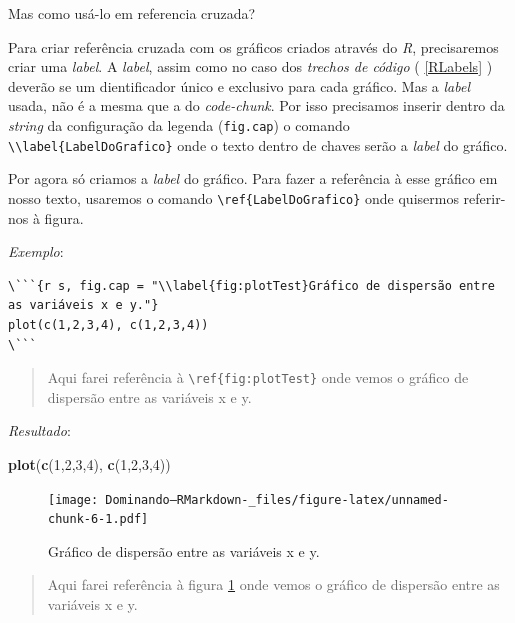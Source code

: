 \documentclass[]{book}
\newenvironment{Shaded}{\begin{snugshade}}{\end{snugshade}}
\newcommand{\DecValTok}[1]{\textcolor[rgb]{0.00,0.00,0.81}{#1}}
\newcommand{\KeywordTok}[1]{\textcolor[rgb]{0.13,0.29,0.53}{\textbf{#1}}}
\newcommand{\NormalTok}[1]{#1}
\begin{document}
Mas como usá-lo em referencia cruzada?

Para criar referência cruzada com os gráficos criados através do \emph{R}, precisaremos criar uma \emph{label}. A \emph{label}, assim como no caso dos \emph{trechos de código} ( \ref{RLabels} ) deverão se um dientificador único e exclusivo para cada gráfico. Mas a \emph{label} usada, não é a mesma que a do \emph{code-chunk}. Por isso precisamos inserir dentro da \emph{string} da configuração da legenda (\texttt{fig.cap}) o comando \texttt{\textbackslash{}\textbackslash{}label\{LabelDoGrafico\}} onde o texto dentro de chaves serão a \emph{label} do gráfico.

Por agora só criamos a \emph{label} do gráfico. Para fazer a referência à esse gráfico em nosso texto, usaremos o comando \texttt{\textbackslash{}ref\{LabelDoGrafico\}} onde quisermos referir-nos à figura.

\emph{Exemplo}:

\begin{verbatim}
\```{r s, fig.cap = "\\label{fig:plotTest}Gráfico de dispersão entre as variáveis x e y."}
plot(c(1,2,3,4), c(1,2,3,4))
\```
\end{verbatim}

\begin{quote}
Aqui farei referência à \texttt{\textbackslash{}ref\{fig:plotTest\}} onde vemos o gráfico de dispersão entre as variáveis x e y.
\end{quote}

\emph{Resultado}:

\begin{Shaded}
\begin{Highlighting}[]
\KeywordTok{plot}\NormalTok{(}\KeywordTok{c}\NormalTok{(}\DecValTok{1}\NormalTok{,}\DecValTok{2}\NormalTok{,}\DecValTok{3}\NormalTok{,}\DecValTok{4}\NormalTok{), }\KeywordTok{c}\NormalTok{(}\DecValTok{1}\NormalTok{,}\DecValTok{2}\NormalTok{,}\DecValTok{3}\NormalTok{,}\DecValTok{4}\NormalTok{))}
\end{Highlighting}
\end{Shaded}

\begin{figure}
\centering
\texttt{[image: Dominando--RMarkdown-\_files/figure-latex/unnamed-chunk-6-1.pdf]}
\caption{\label{fig:unnamed-chunk-6}\label{fig:plotTest}Gráfico de dispersão entre as variáveis x e y.}
\end{figure}

\begin{quote}
Aqui farei referência à figura \ref{fig:plotTest} onde vemos o gráfico de dispersão entre as variáveis x e y.
\end{quote}
\end{document}
